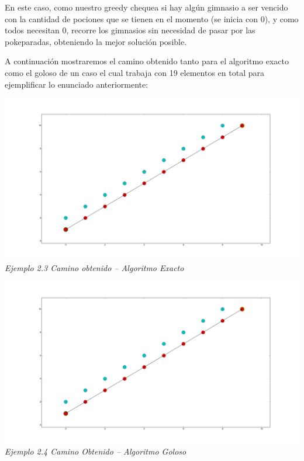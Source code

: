En este caso, como nuestro greedy chequea si hay alg\'un gimnasio a ser vencido con la cantidad de pociones que se tienen en el momento (se inicia con 0), y como todos necesitan 0, recorre los gimnasios sin necesidad de pasar por las pokeparadas, obteniendo la mejor soluci\'on posible.

A continuaci\'on mostraremos el camino obtenido tanto para el algoritmo exacto como el goloso de un caso el cual trabaja con 19 elementos en total para ejemplificar lo enunciado anteriormente:

  \vspace*{0.3cm} \vspace*{0.3cm}
  \begin{center}
\includegraphics[scale=0.60]{./EJ2/grafotodos0.png}
\\{\textit{Ejemplo 2.3 Camino obtenido -- Algoritmo Exacto}}
  \end{center}
  \vspace*{0.3cm}

  \vspace*{0.3cm} \vspace*{0.3cm}
  \begin{center}
\includegraphics[scale=0.60]{./EJ2/grafotodos0.png}
\\{\textit{Ejemplo 2.4 Camino Obtenido -- Algoritmo Goloso}}
  \end{center}
  \vspace*{0.3cm}

